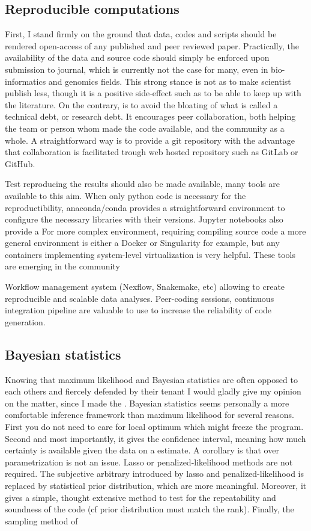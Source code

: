 \subsection{Reproducible computations}
First, I stand firmly on the ground that data, codes and scripts should be rendered open-access of any published and peer reviewed paper.
Practically, the availability of the data and source code should simply be enforced upon submission to journal, which is currently not the case for many, even in bio-informatics and genomics fields.
This strong stance is not as to make scientist publish less, though it is a positive side-effect such as to be able to keep up with the literature.
On the contrary, is to avoid the bloating of what is called a technical debt, or research debt.
It encourages peer collaboration, both helping the team or person whom made the code available, and the community as a whole.
A straightforward way is to provide a git repository with the advantage that collaboration is facilitated trough web hosted repository such as GitLab or GitHub.

Test reproducing the results should also be made available, many tools are available to this aim.
When only python code is necessary for the reproductibility, anaconda/conda provides a straightforward environment to configure the necessary libraries with their versions. 
Jupyter notebooks also provide a 
For more complex environment, requiring compiling source code a more general environment is either a Docker or Singularity for example, but any containers implementing system-level virtualization is very helpful.
These tools are emerging in the community 


Workflow management system (Nexflow, Snakemake, etc) allowing to create reproducible and scalable data analyses.
Peer-coding sessions, continuous integration pipeline are valuable to use to increase the reliability of code generation.
 
\subsection{Bayesian statistics}
Knowing that maximum likelihood and Bayesian statistics are often opposed to each others and fiercely defended by their tenant I would gladly give my opinion on the matter, since I made the . 
Bayesian statistics seems personally a more comfortable inference framework than maximum likelihood for several reasons. 
First you do not need to care for local optimum which might freeze the program.
Second and most importantly, it gives the confidence interval, meaning how much certainty is available given the data on a estimate.
A corollary is that over parametrization is not an issue. 
Lasso or penalized-likelihood methods are not required.
The subjective arbitrary introduced by lasso and penalized-likelihood is replaced by statistical prior distribution, which are more meaningful.
Moreover, it gives a simple, thought extensive method to test for the repeatability and soundness of the code (cf prior distribution must match the rank).
Finally, the sampling method of 

